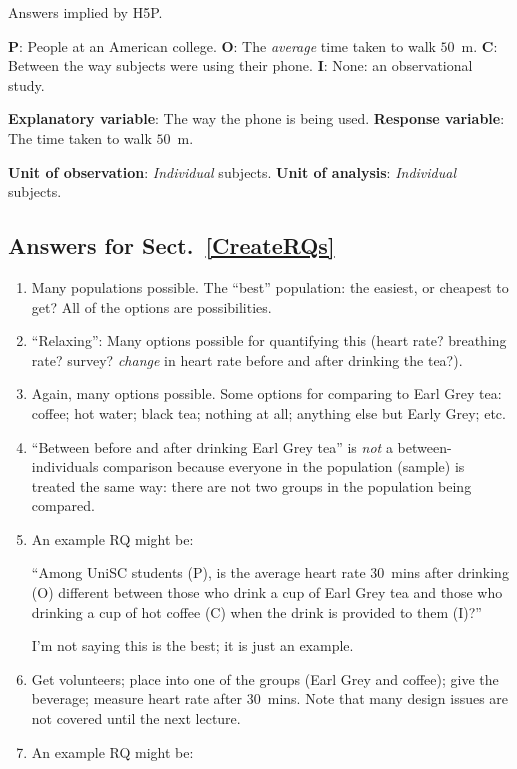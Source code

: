 \documentclass[
  11pt,
  a4paper,
  krantz2]{krantz}
\begin{document}
\begin{footnotesize}
Answers implied by H5P.

\textbf{P}: People at an American college.
\textbf{O}: The \emph{average} time taken to walk \(50\)~m.
\textbf{C}: Between the way subjects were using their phone.
\textbf{I}: None: an observational study.

\textbf{Explanatory variable}: The way the phone is being used.
\textbf{Response variable}: The time taken to walk \(50\)~m.

\textbf{Unit of observation}: \emph{Individual} subjects.
\textbf{Unit of analysis}: \emph{Individual} subjects.

\subsection*{Answers for Sect.~\ref{CreateRQs}}\label{answers-for-sect.-refcreaterqs}

\begin{enumerate}
\def\labelenumi{\arabic{enumi}.}
\item
  Many populations possible. The ``best'' population: the easiest, or cheapest to get?
  All of the options are possibilities.
\item
  ``Relaxing'': Many options possible for quantifying this (heart rate? breathing rate? survey? \emph{change} in heart rate before and after drinking the tea?).
\item
  Again, many options possible. Some options for comparing to Earl Grey tea: coffee; hot water; black tea; nothing at all; anything else but Early Grey; etc.
\item
  ``Between before and after drinking Earl Grey tea'' is \emph{not} a between-individuals comparison because everyone in the population (sample) is treated the same way: there are not two groups in the population being compared.
\item
  An example RQ might be:

  ``Among UniSC students (P), is the average heart rate \(30\)~mins after drinking (O) different between those who drink a cup of Earl Grey tea and those who drinking a cup of hot coffee (C) when the drink is provided to them (I)?''

  I'm not saying this is the best; it is just an example.
\item
  Get volunteers; place into one of the groups (Earl Grey and coffee); give the beverage; measure heart rate after \(30\)~mins.
  Note that many design issues are not covered until the next lecture.
\item
  An example RQ might be:


\end{enumerate}
\end{footnotesize}
\end{document}
